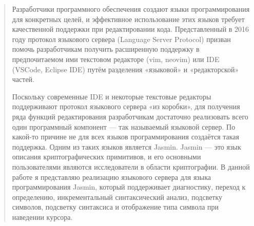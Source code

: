\begin{abstract}

Разработчики программного обеспечения создают языки программирования для
конкретных целей, и эффективное использование этих языков требует качественной
поддержки при редактировании кода. Представленный в 2016 году протокол языкового
сервера (Language Server Protocol) призван помочь разработчикам получить
расширенную поддержку в предпочитаемом ими текстовом редакторе (vim, neovim) или
IDE (VSCode, Eclipse IDE) путём разделения «языковой» и «редакторской» частей.

Поскольку современные IDE и некоторые текстовые редакторы поддерживают протокол
языкового сервера «из коробки», для получения ряда функций редактирования
разработчикам достаточно реализовать всего один программный компонент — так
называемый языковой сервер. По какой-то причине не для всех языков
программирования создаётся такая поддержка. Одним из таких языков является
Jasmin. Jasmin — это язык описания криптографических примитивов, и его основными
пользователями являются исследователи в области криптографии. В данной работе я
представляю реализацию языкового сервера для языка программирования Jasmin,
который поддерживает диагностику, переход к определению, инкрементальный
синтаксический анализ, подсветку символов, подсветку синтаксиса и отображение
типа символа при наведении курсора.

\end{abstract}